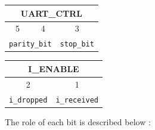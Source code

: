 \documentclass[11pt]{article}
\begin{document}
\begin{center}
\begin{tabular}{|c|c|c|}
\hline
\multicolumn{3}{|c|}{UART\_CTRL}\\
\hline
5 & 4 & 3\\
\hline
\multicolumn{2}{|c|}{\texttt{parity\_bit}} & \texttt{stop\_bit}\\
\hline
\end{tabular}
\begin{tabular}{|c|c|}
\hline
\multicolumn{2}{|c|}{I\_ENABLE}\\
\hline
2 & 1\\
\hline
\texttt{i\_dropped} & \texttt{i\_received}\\
\hline
\end{tabular}
\end{center}
The role of each bit is described below :
\end{document}
